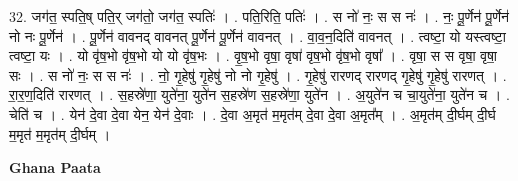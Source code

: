 \documentclass[17pt]{extarticle}
\begin{document}
32. जग॑त॒ स्पति॒ष् पति॒र् जग॑तो॒ जग॑त॒ स्पतिः॑ । . पति॒रिति॒ पतिः॑ । . स नो॑ नः॒ स स नः॑ । . नः॒ पू॒र्णेन॑ पू॒र्णेन॑ नो नः पू॒र्णेन॑ । . पू॒र्णेन॑ वावनद् वावनत् पू॒र्णेन॑ पू॒र्णेन॑ वावनत् । . वा॒व॒न॒दिति॑ वावनत् । . त्वष्टा॒ यो यस्त्वष्टा॒ त्वष्टा॒ यः । . यो वृ॑ष॒भो वृ॑ष॒भो यो यो वृ॑ष॒भः । . वृ॒ष॒भो वृषा॒ वृषा॑ वृष॒भो वृ॑ष॒भो वृषा᳚ । . वृषा॒ स स वृषा॒ वृषा॒ सः । . स नो॑ नः॒ स स नः॑ । . नो॒ गृ॒हेषु॑ गृ॒हेषु॑ नो नो गृ॒हेषु॑ । . गृ॒हेषु॑ रारणद् रारणद् गृ॒हेषु॑ गृ॒हेषु॑ रारणत् । . रा॒र॒ण॒दिति॑ रारणत् । . स॒हस्रे॑णा॒ युते॑ना॒ युते॑न स॒हस्रे॑ण स॒हस्रे॑णा॒ युते॑न । . अ॒युते॑न च चा॒युते॑ना॒ युते॑न च । . चेति॑ च । . येन॑ दे॒वा दे॒वा येन॒ येन॑ दे॒वाः । . दे॒वा अ॒मृत॑ म॒मृत॑म् दे॒वा दे॒वा अ॒मृत᳚म् । . अ॒मृत॑म् दी॒र्घम् दी॒र्घ म॒मृत॑ म॒मृत॑म् दी॒र्घम् । \newline

\textbf{Ghana Paata } \newline
\end{document}
